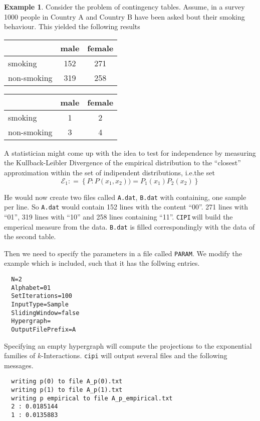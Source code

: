 \documentclass[12pt]{amsart}
\newcommand{\set}[1]{\left\lbrace #1 \right\rbrace} %
\newcommand{\defas}{\mathrel{\mathop{:}}=}   %
\newcommand{\ie}{i.e.\;}  %
\newcommand{\cipi}{\texttt{CIPI}\,}
\theoremstyle{plain}%
\theoremstyle{definition}
\newtheorem{exmp}[thm]{Example}
\theoremstyle{remark}
\begin{document}
\begin{exmp}
  Consider the problem of contingency tables. Assume, in a survey 1000 people in
  Country A and Country B have been asked bout their smoking behaviour. This
  yielded the following results
  \begin{center}
  \begin{tabular}[]{|l|c|c|}
    \hline
    & male & female \\
    \hline
    smoking & 152 & 271 \\
    non-smoking & 319 & 258\\
    \hline
  \end{tabular}\hspace{1cm}
  \begin{tabular}[]{|l|c|c|}
    \hline
    & male & female \\
    \hline
    smoking & 1 & 2 \\
    non-smoking & 3 & 4\\
    \hline
  \end{tabular}
\end{center}

  A statistician might come up with the idea to test for independence by
  measuring the Kullback-Leibler Divergence of the empirical distribution to the
  ``closest'' approximation within the set of indipendent distributions, \ie the
  set 
  \begin{equation*}
    \mathcal{E}_1 \defas \set{P : P\left( x_1,x_2 \right)) = P_1(x_1)P_2(x_2)}
  \end{equation*}

  He would now create two files called \texttt{A.dat}, \texttt{B.dat} with
  containing, one sample per line. So \texttt{A.dat} would contain 152 lines
  with the content ``00''. 271 lines with ``01'', 319 lines with ``10'' and 258
  lines containing ``11''. \cipi will build the emperical measure from the data.
  \texttt{B.dat} is filled correspondingly with the data of the second table. 

  Then we need to specify the parameters in a file called \texttt{PARAM}. We
  modify the example which is included, such that it has the follwing entries.
  \begin{verbatim}
  N=2
  Alphabet=01
  SetIterations=100
  InputType=Sample
  SlidingWindow=false
  Hypergraph=
  OutputFilePrefix=A
  \end{verbatim}
  Specifying an empty hypergraph will compute the projections to the exponential
  families of $k$-Interactions. \texttt{cipi} will output several files and the
  following messages.
  \begin{verbatim}
  writing p(0) to file A_p(0).txt
  writing p(1) to file A_p(1).txt
  writing p empirical to file A_p_empirical.txt
  2 : 0.0185144
  1 : 0.0135883


\end{verbatim}
\end{exmp}
\end{document}
